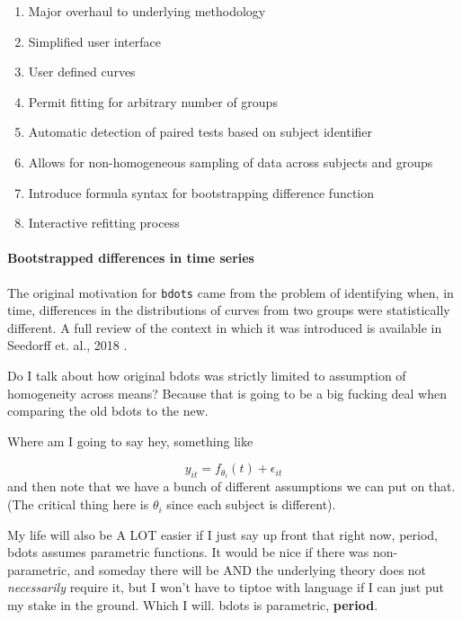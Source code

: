 \documentclass{article}
\newcommand{\xt}{\texttt}%
\begin{document}
\begin{singlespace}
\begin{enumerate}
\item Major overhaul to underlying methodology 
\item Simplified user interface
\item User defined curves
\item Permit fitting for arbitrary number of groups
\item Automatic detection of paired tests based on subject identifier
\item Allows for non-homogeneous sampling of data across subjects and groups
\item Introduce formula syntax for bootstrapping difference function
\item Interactive refitting process
\end{enumerate}
\end{singlespace}

\paragraph{Bootstrapped differences in time series}

The original motivation for \xt{bdots} came from the problem of identifying when, in time, differences in the distributions of curves from two groups were statistically different. A full review of the context in which it was introduced is available in Seedorff et. al., 2018 \cite{seedorff2018bdots}.

Do I talk about how original bdots was strictly limited to assumption of homogeneity across means? Because that is going to be a big fucking deal when comparing the old bdots to the new.

Where am I going to say hey, something like

\begin{equation}
y_{it} = f_{\theta_i}(t) + \epsilon_{it}
\end{equation}
and then note that we have a bunch of different assumptions we can put on that. (The critical thing here is $\theta_i$ since each subject is different).

My life will also be A LOT easier if I just  say up front that right now, period, bdots assumes parametric functions. It would be nice if there was non-parametric, and someday there will be AND the underlying theory does not \textit{necessarily} require it, but I won't have to tiptoe with language if I can just put my stake in the ground. Which I will. bdots is parametric, \textbf{period}.
\end{document}

